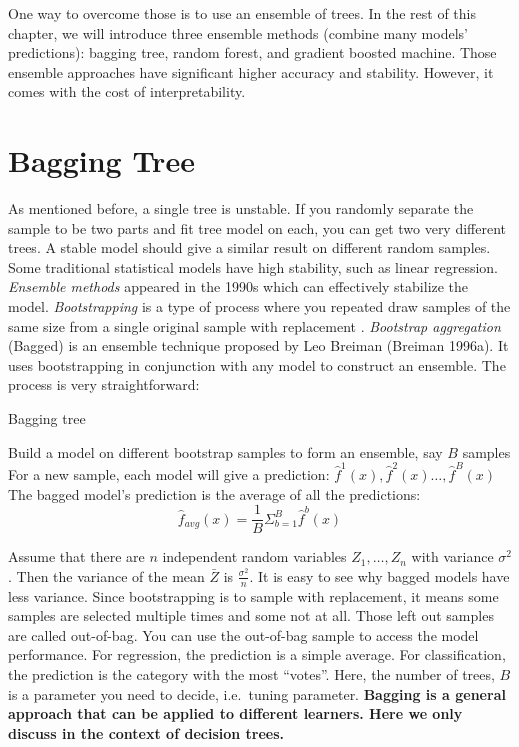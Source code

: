 \documentclass[12pt,]{krantz}
\begin{document}
One way to overcome those is to use an ensemble of trees. In the rest of this chapter, we will introduce three ensemble methods (combine many models' predictions): bagging tree, random forest, and gradient boosted machine. Those ensemble approaches have significant higher accuracy and stability. However, it comes with the cost of interpretability.

\hypertarget{bagging-tree}{%
\section{Bagging Tree}\label{bagging-tree}}

As mentioned before, a single tree is unstable. If you randomly separate the sample to be two parts and fit tree model on each, you can get two very different trees. A stable model should give a similar result on different random samples. Some traditional statistical models have high stability, such as linear regression. \emph{Ensemble methods} appeared in the 1990s which can effectively stabilize the model. \emph{Bootstrapping} is a type of process where you repeated draw samples of the same size from a single original sample with replacement \citep{Efron1986}. \emph{Bootstrap aggregation} (Bagged) is an ensemble technique proposed by Leo Breiman (Breiman 1996a). It uses bootstrapping in conjunction with any model to construct an ensemble. The process is very straightforward:

\begin{algorithm}
\caption{Bagging tree}\label{baggingtreealgorithm} 
\begin{algorithmic}[1] 
\State Build a model on different bootstrap samples to form an ensemble, say $B$ samples
\State For a new sample, each model will give a prediction: $\hat{f}^1(x),\hat{f}^2(x)\dots,\hat{f}^B(x)$
\State The bagged model's prediction is the average of all the predictions: $$\hat{f}_{avg}(x)=\frac{1}{B}\Sigma^B_{b=1}\hat{f}^b(x)$$
\end{algorithmic}
\end{algorithm}

Assume that there are \(n\) independent random variables \(Z_1,\dots,Z_n\) with variance \(\sigma^2\). Then the variance of the mean \(\bar{Z}\) is \(\frac{\sigma^2}{n}\). It is easy to see why bagged models have less variance. Since bootstrapping is to sample with replacement, it means some samples are selected multiple times and some not at all. Those left out samples are called out-of-bag. You can use the out-of-bag sample to access the model performance. For regression, the prediction is a simple average. For classification, the prediction is the category with the most ``votes''. Here, the number of trees, \(B\) is a parameter you need to decide, i.e.~tuning parameter. \textbf{Bagging is a general approach that can be applied to different learners. Here we only discuss in the context of decision trees.}
\end{document}
